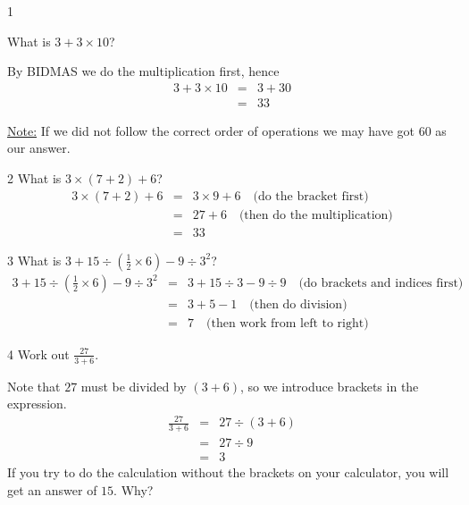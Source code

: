 \begin{ex}{1}

What is $3 + 3\times 10$?

By BIDMAS we do the multiplication first, hence 
\begin{eqnarray*}
3 + 3\times 10 &=& 3+ 30\\
	       &=& 33
\end{eqnarray*}


\underline{Note:}  If we did not follow the correct order of 
operations we may have
got $60$ as our answer.
\end{ex}


	      


\begin{ex}{2}
What is $3 \times (7+2)+6$?
\begin{eqnarray*}
3 \times (7+2) +6 &=& 3 \times 9 +6 \quad \mbox{(do the bracket first)} \\
		  &=& 27+6 \quad \mbox{(then do the multiplication)} \\
		  &=&33
\end{eqnarray*}
\end{ex}
\begin{ex}{3}
What is    $3+15 \div (\frac{1}{2} \times 6)-9 \div 3^{2}$?
\begin{eqnarray*}
3+15 \div (\frac{1}{2} \times 6)-9 \div 3^{2} & = & 3+15 \div 3 - 9 \div 9  
\quad \mbox{(do brackets and indices first)} \\
				     &=& 3+5-1 
\quad \mbox{(then do division)} \\
				     &=& 7
\quad \mbox{(then work from left to right)} 
\end{eqnarray*}
\end{ex}
\begin{ex}{4}
 Work out $\frac{27}{3+6}$.

Note that $27$ must be divided by $(3+6)$, so we introduce brackets in
the expression.
\begin{eqnarray*}
\frac{27}{3+6} & = & 27 \div (3+6) \\
  & = & 27 \div 9 \\
 & = & 3
\end{eqnarray*}
If you try to do the calculation without the brackets on your
calculator, you will get an answer of $15$. Why?
\end{ex}


\subsubsection{}

